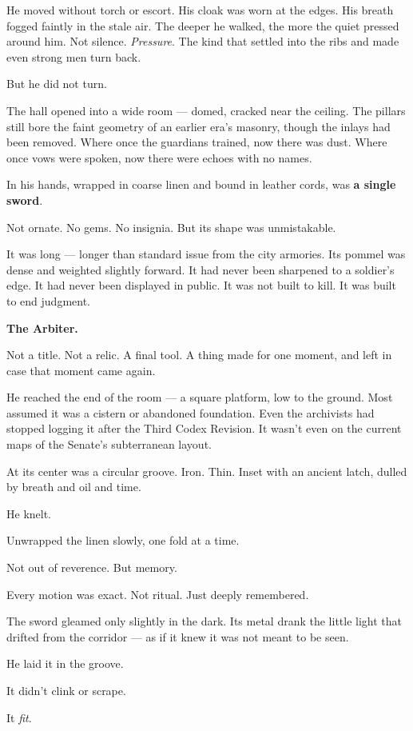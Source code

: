 \documentclass[9pt]{article}
\begin{document}
He moved without torch or escort. His cloak was worn at the edges. His breath fogged faintly in the stale air. The deeper he walked, the more the quiet pressed around him. Not silence. \textit{Pressure}. The kind that settled into the ribs and made even strong men turn back.

But he did not turn.

The hall opened into a wide room --- domed, cracked near the ceiling. The pillars still bore the faint geometry of an earlier era's masonry, though the inlays had been removed. Where once the guardians trained, now there was dust. Where once vows were spoken, now there were echoes with no names.

In his hands, wrapped in coarse linen and bound in leather cords, was \textbf{a single sword}.

Not ornate. No gems. No insignia. But its shape was unmistakable.

It was long --- longer than standard issue from the city armories. Its pommel was dense and weighted slightly forward. It had never been sharpened to a soldier’s edge. It had never been displayed in public. It was not built to kill. It was built to end judgment.

\textbf{The Arbiter.}

Not a title. Not a relic. A final tool. A thing made for one moment, and left in case that moment came again.

He reached the end of the room --- a square platform, low to the ground. Most assumed it was a cistern or abandoned foundation. Even the archivists had stopped logging it after the Third Codex Revision. It wasn’t even on the current maps of the Senate’s subterranean layout.

At its center was a circular groove. Iron. Thin. Inset with an ancient latch, dulled by breath and oil and time.

He knelt.

Unwrapped the linen slowly, one fold at a time.

Not out of reverence. But memory.

Every motion was exact. Not ritual. Just deeply remembered.

The sword gleamed only slightly in the dark. Its metal drank the little light that drifted from the corridor --- as if it knew it was not meant to be seen.

He laid it in the groove.

It didn’t clink or scrape.

It \textit{fit}.
\end{document}
